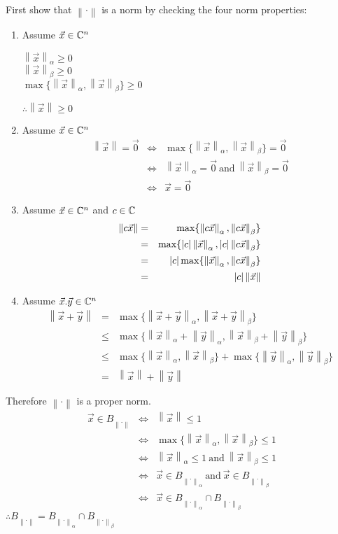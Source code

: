 \documentclass[letterpaper,12pt,fleqn]{article}
\newcommand{\norm}[1]{\left\lVert#1\right\rVert}
\newcommand{\vx}{\vec{x}}
\newcommand{\vy}{\vec{y}}
\newcommand{\vz}{\vec{0}}
\renewcommand{\a}{\alpha}
\renewcommand{\b}{\beta}
\newcommand{\nc}{\norm{\cdot}}
\begin{document}
First show that $\nc$ is a norm by checking the four norm properties:
\begin{enumerate}
\item Assume $\vx\in\C^n$

  $\norm{\vx}_{\a}\ge0$ \\
  $\norm{\vx}_{\b}\ge0$ \\
  $\max\{\norm{\vx}_{\a},\norm{\vx}_{\b}\}\ge0$

  $\therefore\norm{\vx}\ge0$

\item Assume $\vx\in\C^n$
  \begin{eqnarray*}
    \norm{\vx}=\vz &\iff& \max\{\norm{\vx}_{\a},\norm{\vx}_{\b}\}=\vz \\
    &\iff& \norm{\vx}_{\a}=\vz\ \mbox{and}\ \norm{\vx}_{\b}=\vz \\
    &\iff& \vx=\vz
  \end{eqnarray*}

\item Assume $\vx\in\C^n$ and $c\in\mathbb{C}$
  \begin{eqnarray*}
    \norm{c\vx} &=& \max\{\norm{c\vx}_{\a},\norm{c\vx}_{\b}\} \\
    &=& \max\{\abs{c}\norm{\vx}_{\a},\abs{c}\norm{c\vx}_{\b}\} \\
    &=& \abs{c}\max\{\norm{\vx}_{\a},\norm{c\vx}_{\b}\} \\
    &=& \abs{c}\norm{\vx}
  \end{eqnarray*}

\item Assume $\vx.\vy\in\C^n$
  \begin{eqnarray*}
    \norm{\vx+\vy} &=& \max\{\norm{\vx+\vy}_{\a},\norm{\vx+\vy}_{\b}\} \\
    &\le& \max\{\norm{\vx}_{\a}+\norm{\vy}_{\a},
    \norm{\vx}_{\b}+\norm{\vy}_{\b}\} \\
    &\le& \max\{\norm{\vx}_{\a},\norm{\vx}_{\b}\}+
    \max\{\norm{\vy}_{\a},\norm{\vy}_{\b}\} \\
    &=& \norm{\vx}+\norm{\vy}
  \end{eqnarray*}
\end{enumerate}

Therefore $\nc$ is a proper norm.
\begin{eqnarray*}
  \vx\in B_{\nc} &\iff& \norm{\vx}\le1 \\
  &\iff& \max\{\norm{\vx}_{\a},\norm{\vx}_{\b}\}\le1 \\
  &\iff& \norm{\vx}_{\a}\le1\ \mbox{and}\ \norm{\vx}_{\b}\le1 \\
  &\iff& \vx\in B_{\nc_{\a}}\ \mbox{and}\ \vx\in B_{\nc_{\b}} \\
  &\iff& \vx\in B_{\nc_{\a}}\cap B_{\nc_{\b}}
\end{eqnarray*}
$\therefore B_{\nc}=B_{\nc_{\a}}\cap B_{\nc_{\b}}$
\end{document}
